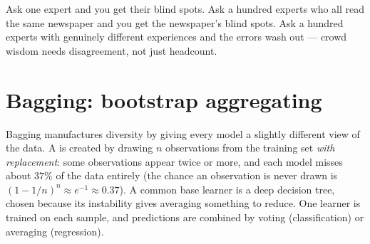 \begin{intuition}
Ask one expert and you get their blind spots. Ask a hundred experts who all read the same newspaper and you get the newspaper's blind spots. Ask a hundred experts with genuinely different experiences and the errors wash out --- crowd wisdom needs disagreement, not just headcount.
\end{intuition}

\section{Bagging: bootstrap aggregating}

Bagging manufactures diversity by giving every model a slightly different view of the data. A  is created by drawing $n$ observations from the training set \emph{with replacement}: some observations appear twice or more, and each model misses about $37\%$ of the data entirely (the chance an observation is never drawn is ${(1-1/n)}^n\approx e^{-1}\approx 0.37$). A common base learner is a deep decision tree, chosen because its instability gives averaging something to reduce. One learner is trained on each sample, and predictions are combined by voting (classification) or averaging (regression).

\begin{mlfigure}
\end{mlfigure}

